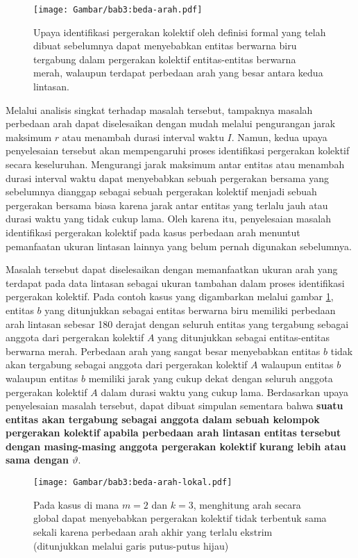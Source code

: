 \begin{figure}[t]
    \centering
    \texttt{[image: Gambar/bab3:beda-arah.pdf]}
    \caption[Masalah identifikasi pada kasus perbedaan arah]{Upaya identifikasi pergerakan kolektif oleh definisi formal yang telah dibuat sebelumnya dapat menyebabkan entitas berwarna biru tergabung dalam pergerakan kolektif entitas-entitas berwarna merah, walaupun terdapat perbedaan arah yang besar antara kedua lintasan.}
    \label{bab3:masalah-arah}
\end{figure}
    
Melalui analisis singkat terhadap masalah tersebut, tampaknya masalah perbedaan arah dapat diselesaikan dengan mudah melalui pengurangan jarak maksimum $r$ atau menambah durasi interval waktu $I$. Namun, kedua upaya penyelesaian tersebut akan mempengaruhi proses identifikasi pergerakan kolektif secara keseluruhan. Mengurangi jarak maksimum antar entitas atau menambah durasi interval waktu dapat menyebabkan sebuah pergerakan bersama yang sebelumnya dianggap sebagai sebuah pergerakan kolektif menjadi sebuah pergerakan bersama biasa karena jarak antar entitas yang terlalu jauh atau durasi waktu yang tidak cukup lama. Oleh karena itu, penyelesaian masalah identifikasi pergerakan kolektif pada kasus perbedaan arah menuntut pemanfaatan ukuran lintasan lainnya yang belum pernah digunakan sebelumnya.
    
Masalah tersebut dapat diselesaikan dengan memanfaatkan ukuran arah yang terdapat pada data lintasan sebagai ukuran tambahan dalam proses identifikasi pergerakan kolektif. Pada contoh kasus yang digambarkan melalui gambar \ref{bab3:masalah-arah}, entitas $b$ yang ditunjukkan sebagai entitas berwarna biru memiliki perbedaan arah lintasan sebesar 180 derajat dengan seluruh entitas yang tergabung sebagai anggota dari pergerakan kolektif $A$ yang ditunjukkan sebagai entitas-entitas berwarna merah. Perbedaan arah yang sangat besar menyebabkan entitas $b$ tidak akan tergabung sebagai anggota dari pergerakan kolektif $A$ walaupun entitas $b$ walaupun entitas $b$ memiliki jarak yang cukup dekat dengan seluruh anggota pergerakan kolektif $A$ dalam durasi waktu yang cukup lama. Berdasarkan upaya penyelesaian masalah tersebut, dapat dibuat simpulan sementara bahwa \textbf{suatu entitas akan tergabung sebagai anggota dalam sebuah kelompok pergerakan kolektif apabila perbedaan arah lintasan entitas tersebut dengan masing-masing anggota pergerakan kolektif kurang lebih atau sama dengan $\vartheta$}.

\begin{figure}
    \centering
    \texttt{[image: Gambar/bab3:beda-arah-lokal.pdf]}
    \caption[Masalah identifikasi pada penghitungan arah secara global]{Pada kasus di mana $m = 2$ dan $k = 3$, menghitung arah secara global dapat menyebabkan pergerakan kolektif tidak terbentuk sama sekali karena perbedaan arah akhir yang terlalu ekstrim (ditunjukkan melalui garis putus-putus hijau)}
    \label{bab3:beda-arah-lokal}
\end{figure}

